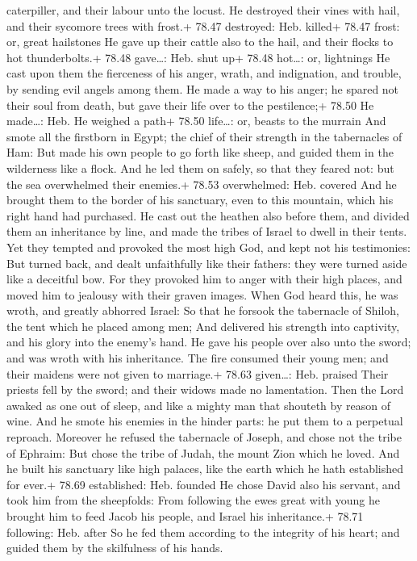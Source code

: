 caterpiller, and their labour unto the locust.  He
destroyed their vines with hail, and their sycomore trees with frost.+
78.47 destroyed: Heb. killed+ 78.47 frost: or, great hailstones
 He gave up their cattle also to the hail, and their flocks
to hot thunderbolts.+ 78.48 gave\ldots: Heb. shut up+ 78.48 hot\ldots:
or, lightnings  He cast upon them the fierceness of his
anger, wrath, and indignation, and trouble, by sending evil angels among
them.  He made a way to his anger; he spared not their soul
from death, but gave their life over to the pestilence;+ 78.50 He
made\ldots: Heb. He weighed a path+ 78.50 life\ldots: or, beasts to the
murrain  And smote all the firstborn in Egypt; the chief of
their strength in the tabernacles of Ham:  But made his own
people to go forth like sheep, and guided them in the wilderness like a
flock.  And he led them on safely, so that they feared not:
but the sea overwhelmed their enemies.+ 78.53 overwhelmed: Heb. covered
 And he brought them to the border of his sanctuary, even
to this mountain, which his right hand had purchased.  He
cast out the heathen also before them, and divided them an inheritance
by line, and made the tribes of Israel to dwell in their tents.
 Yet they tempted and provoked the most high God, and kept
not his testimonies:  But turned back, and dealt
unfaithfully like their fathers: they were turned aside like a deceitful
bow.  For they provoked him to anger with their high
places, and moved him to jealousy with their graven images.
 When God heard this, he was wroth, and greatly abhorred
Israel:  So that he forsook the tabernacle of Shiloh, the
tent which he placed among men;  And delivered his strength
into captivity, and his glory into the enemy's hand.  He
gave his people over also unto the sword; and was wroth with his
inheritance.  The fire consumed their young men; and their
maidens were not given to marriage.+ 78.63 given\ldots: Heb. praised
 Their priests fell by the sword; and their widows made no
lamentation.  Then the Lord awaked as one out of sleep, and
like a mighty man that shouteth by reason of wine.  And he
smote his enemies in the hinder parts: he put them to a perpetual
reproach.  Moreover he refused the tabernacle of Joseph,
and chose not the tribe of Ephraim:  But chose the tribe of
Judah, the mount Zion which he loved.  And he built his
sanctuary like high palaces, like the earth which he hath established
for ever.+ 78.69 established: Heb. founded  He chose David
also his servant, and took him from the sheepfolds:  From
following the ewes great with young he brought him to feed Jacob his
people, and Israel his inheritance.+ 78.71 following: Heb. after
 So he fed them according to the integrity of his heart;
and guided them by the skilfulness of his hands.

